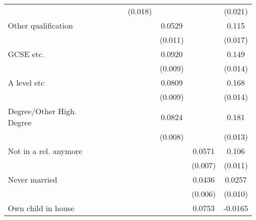 \begin{table}[htbp]
{\begin{tabular}{l*{7}{c}}
                &                  &                  &                  &  (0.018)         &                  &                  &  (0.021)         \\
[1em]
Other qualification&                  &                  &                  &                  &   0.0529\sym{***}&                  &    0.115\sym{***}\\
                &                  &                  &                  &                  &  (0.011)         &                  &  (0.017)         \\
[1em]
GCSE etc.       &                  &                  &                  &                  &   0.0920\sym{***}&                  &    0.149\sym{***}\\
                &                  &                  &                  &                  &  (0.009)         &                  &  (0.014)         \\
[1em]
A level etc     &                  &                  &                  &                  &   0.0809\sym{***}&                  &    0.168\sym{***}\\
                &                  &                  &                  &                  &  (0.009)         &                  &  (0.014)         \\
[1em]
Degree/Other High. Degree&                  &                  &                  &                  &   0.0824\sym{***}&                  &    0.181\sym{***}\\
                &                  &                  &                  &                  &  (0.008)         &                  &  (0.013)         \\
[1em]
Not in a rel. anymore&                  &                  &                  &                  &                  &   0.0571\sym{***}&    0.106\sym{***}\\
                &                  &                  &                  &                  &                  &  (0.007)         &  (0.011)         \\
[1em]
Never married   &                  &                  &                  &                  &                  &   0.0436\sym{***}&   0.0257\sym{**} \\
                &                  &                  &                  &                  &                  &  (0.006)         &  (0.010)         \\
[1em]
Own child in house&                  &                  &                  &                  &                  &   0.0753\sym{***}&  -0.0165\sym{*}  \\

\end{tabular}}
\end{table}
